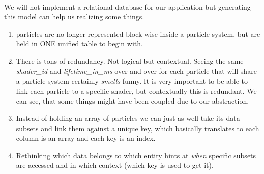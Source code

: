 \\
We will not implement a relational database for our application but generating this model can help us realizing some things.
\begin{enumerate}
	\item particles are no longer represented block-wise inside a particle system, but are held in ONE unified table to begin with.
	\item There is tons of redundancy. Not logical but contextual. Seeing the same \textit{shader\_id} and \textit{lifetime\_in\_ms} over and over for each particle that will share a particle system certainly \textit{smells} funny. It is very important to be able to link each particle to a specific shader, but contextually this is redundant. We can see, that some things might have been coupled due to our abstraction.
	\item Instead of holding an array of particles we can just as well take its data subsets and link them against a unique key, which basically translates to each column is an array and each key is an index.
	\item Rethinking which data belongs to which entity hints at \textit{when} specific subsets are accessed and in which context (which key is used to get it).
\end{enumerate}

